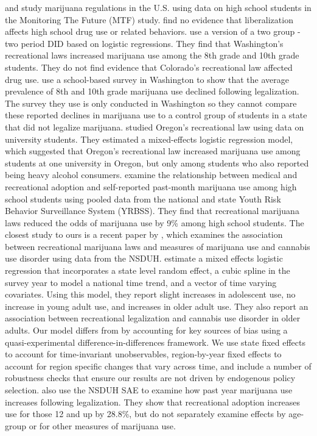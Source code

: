 \documentclass[12pt]{article}%
\begin{document}
\citet{Dills2017} and \citet{Cerda2017} study marijuana regulations in the U.S. using data on high school students in the Monitoring The Future (MTF) study. \cite{Dills2017} find no evidence that liberalization affects high school drug use or related behaviors. \cite{Cerda2017} use a version of a two group - two period DID based on logistic regressions. They find that Washington’s recreational laws increased marijuana use among the 8th grade and 10th grade students. They do not find evidence that Colorado’s recreational law affected drug use. 
\citet{Dilley2019} use a school-based survey in Washington to show that the average prevalence of 8th and 10th grade marijuana use declined following legalization. The survey they use is only conducted in Washington so they cannot compare these reported declines in marijuana use to a control group of students in a state that did not legalize marijuana. 
\cite{Kerr2017} studied Oregon's recreational law using data on university students. They estimated a mixed-effects logistic regression model, which suggested that Oregon’s recreational law increased marijuana use among students at one university in Oregon, but only among students who also reported being heavy alcohol consumers. \citet{Anderson2019} examine the relationship between medical and recreational adoption and self-reported past-month marijuana use among high school students using pooled data from the national and state Youth Risk Behavior Surveillance System (YRBSS). They find that recreational marijuana laws reduced the odds of marijuana use by 9\% among high school students. The closest study to ours is a recent paper by  \cite{cerda2020association}, which examines the association between recreational marijuana laws and measures of marijuana use and cannabis use disorder using data from the NSDUH. \cite{cerda2020association} estimate a mixed effects logistic regression that incorporates a state level random effect, a cubic spline in the survey year to model a national time trend, and a vector of time varying covariates. Using this model, they report slight increases in adolescent use, no increase in young adult use, and increases in older adult use. They also report an association between recreational legalization and cannabis use disorder in older adults. Our model differs from \cite{cerda2020association} by accounting for key sources of bias using a quasi-experimental difference-in-differences framework. We use state fixed effects to account for time-invariant unobservables, region-by-year fixed effects to account for region specific changes that vary across time, and include a number of robustness checks that ensure our results are not driven by endogenous policy selection. \citet{MacleanMJUse2021} also use the NSDUH SAE to examine how past year marijuana use increases following legalization. They show that recreational adoption increases use for those 12 and up by 28.8\%, but do not separately examine effects by age-group or for other measures of marijuana use.  
\end{document}
